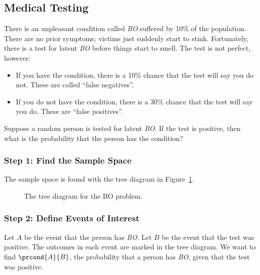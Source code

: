 \subsection{Medical Testing}\label{med_test-subsection}

There is an unpleasant condition called \emph{BO} suffered by 10\% of the
population.  There are no prior symptoms; victims just suddenly start to
stink.  Fortunately, there is a test for latent \emph{BO} before things
start to smell.  The test is not perfect, however:
\begin{itemize}

\item If you have the condition, there is a 10\% chance
that the test will say you do not.  These are called ``false
negatives''.

\item If you do not have the condition, there is a 30\% chance that the test
will say you do.  These are ``false positives''.

\end{itemize}

Suppose a random person is tested for latent \emph{BO}.  If the test is
positive, then what is the probability that the person has the condition?

\subsubsection*{Step 1: Find the Sample Space}

The sample space is found with the tree diagram in
Figure~\ref{fig:15C1}.

\begin{figure}[h]



\caption{The tree diagram for the BO problem.}

\label{fig:15C1}

\end{figure}

\subsubsection*{Step 2: Define Events of Interest}

Let $A$ be the event that the person has \emph{BO}.  Let $B$ be the
event that the test was positive.  The outcomes in each event are marked
in the tree diagram.  We want to find $\prcond{A}{B}$, the probability
that a person has \emph{BO}, given that the test was positive.

